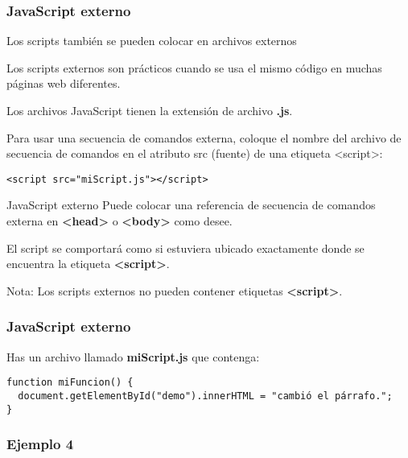 \begin{frame}[fragile]
  \frametitle{JavaScript externo}

  Los scripts también se pueden colocar en archivos externos

  \vspace{\baselineskip}
  Los scripts externos son prácticos cuando se usa el mismo
  código en muchas páginas web diferentes.

  \vspace{\baselineskip}
  Los archivos JavaScript tienen la extensión de archivo \textbf{.js}.

  \vspace{\baselineskip}
  Para usar una secuencia de comandos externa, coloque el nombre del
  archivo de secuencia de comandos en el atributo src (fuente) de
  una etiqueta <script>:

  \vspace{\baselineskip}
  \begin{lstlisting}
<script src="miScript.js"></script>
  \end{lstlisting}
\end{frame}

\begin{frame}[c]{JavaScript externo}
  Puede colocar una referencia de secuencia de comandos externa
  en \textbf{<head>} o \textbf{<body>} como desee.

  El script se comportará como si estuviera ubicado exactamente
  donde se encuentra la etiqueta \textbf{<script>}.

  \begin{alertblock}{Nota:}
    Los scripts externos no pueden contener etiquetas \textbf{<script>}.
  \end{alertblock}
\end{frame}

\begin{frame}[fragile]
  \frametitle{JavaScript externo}

  Has un archivo llamado \textbf{miScript.js} que contenga:

  \vspace{\baselineskip}
  \begin{lstlisting}
function miFuncion() {
  document.getElementById("demo").innerHTML = "cambió el párrafo.";
}
  \end{lstlisting}
\end{frame}

\begin{frame}[fragile]
  \frametitle{Ejemplo 4}
  
\end{frame}

